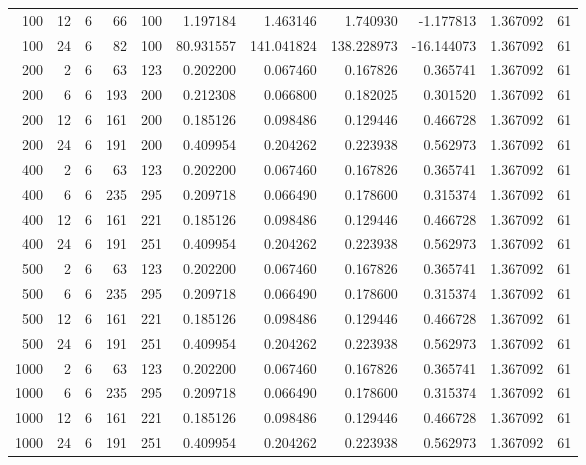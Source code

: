 \begin{table}
\begin{tabular}{rrrrrrrrrrr}
100 & 12 & 6 & 66 & 100 & 1.197184 & 1.463146 & 1.740930 & -1.177813 & 1.367092 & 61 \\
100 & 24 & 6 & 82 & 100 & 80.931557 & 141.041824 & 138.228973 & -16.144073 & 1.367092 & 61 \\
200 & 2 & 6 & 63 & 123 & 0.202200 & 0.067460 & 0.167826 & 0.365741 & 1.367092 & 61 \\
200 & 6 & 6 & 193 & 200 & 0.212308 & 0.066800 & 0.182025 & 0.301520 & 1.367092 & 61 \\
200 & 12 & 6 & 161 & 200 & 0.185126 & 0.098486 & 0.129446 & 0.466728 & 1.367092 & 61 \\
200 & 24 & 6 & 191 & 200 & 0.409954 & 0.204262 & 0.223938 & 0.562973 & 1.367092 & 61 \\
400 & 2 & 6 & 63 & 123 & 0.202200 & 0.067460 & 0.167826 & 0.365741 & 1.367092 & 61 \\
400 & 6 & 6 & 235 & 295 & 0.209718 & 0.066490 & 0.178600 & 0.315374 & 1.367092 & 61 \\
400 & 12 & 6 & 161 & 221 & 0.185126 & 0.098486 & 0.129446 & 0.466728 & 1.367092 & 61 \\
400 & 24 & 6 & 191 & 251 & 0.409954 & 0.204262 & 0.223938 & 0.562973 & 1.367092 & 61 \\
500 & 2 & 6 & 63 & 123 & 0.202200 & 0.067460 & 0.167826 & 0.365741 & 1.367092 & 61 \\
500 & 6 & 6 & 235 & 295 & 0.209718 & 0.066490 & 0.178600 & 0.315374 & 1.367092 & 61 \\
500 & 12 & 6 & 161 & 221 & 0.185126 & 0.098486 & 0.129446 & 0.466728 & 1.367092 & 61 \\
500 & 24 & 6 & 191 & 251 & 0.409954 & 0.204262 & 0.223938 & 0.562973 & 1.367092 & 61 \\
1000 & 2 & 6 & 63 & 123 & 0.202200 & 0.067460 & 0.167826 & 0.365741 & 1.367092 & 61 \\
1000 & 6 & 6 & 235 & 295 & 0.209718 & 0.066490 & 0.178600 & 0.315374 & 1.367092 & 61 \\
1000 & 12 & 6 & 161 & 221 & 0.185126 & 0.098486 & 0.129446 & 0.466728 & 1.367092 & 61 \\
1000 & 24 & 6 & 191 & 251 & 0.409954 & 0.204262 & 0.223938 & 0.562973 & 1.367092 & 61 \\
\bottomrule
\end{tabular}
\end{table}
